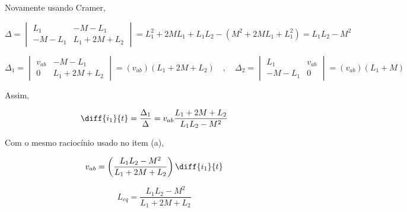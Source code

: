 \endgroup

Novamente usando Cramer,

\begingroup
\renewcommand*{\arraystretch}{4}

\[ 
    \Delta
    =
    \begin{vmatrix}
        L_1 & - M - L_1    \\
        - M - L_1    & L_1 + 2M + L_2
    \end{vmatrix}
    =
    L_1^2 + 2ML_1 + L_1L_2 - (M^2 + 2ML_1 + L_1^2)
    =
    L_1L_2 - M^2
\]

\[ 
    \Delta_1
    =
    \begin{vmatrix}
        v_{ab} & - M - L_1    \\
        0    & L_1 + 2M + L_2
    \end{vmatrix}
    =
    (v_{ab})(L_1 + 2M + L_2) \quad , \quad
    \Delta_2
    =
    \begin{vmatrix}
        L_1 & v_{ab}   \\
        - M - L_1    & 0
    \end{vmatrix}
    =
    (v_{ab})(L_1 + M)
\]

\endgroup

Assim, 

\[ \diff{i_1}{t} = \frac{\Delta_1}{\Delta} = v_{ab}\frac{L_1 + 2M + L_2}{L_1L_2 - M^2} \]

Com o mesmo raciocínio usado no item (a),

\[ v_{ab} =  \left(\frac{L_1L_2 - M^2}{L_1 + 2M + L_2}\right)\diff{i_1}{t} \]

\[ \boxed{L_{eq} = \frac{L_1L_2 - M^2}{L_1 + 2M + L_2}}  \]



